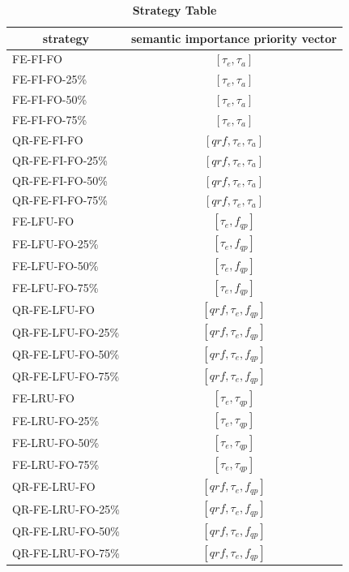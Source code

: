 \begin{table}[!htbp]
\centering
\caption{\textbf{Strategy Table}}
\label{tab:sct}
\begin{tabular}{|l|c|}
\hline
\multicolumn{1}{|c|}{strategy} & semantic importance priority vector \\ \hline
FE-FI-FO & $[\tau_{e}, \tau_{a}]$ \\ \hline
FE-FI-FO-25\% & $[\tau_{e}, \tau_{a}]$ \\ \hline
FE-FI-FO-50\% & $[\tau_{e}, \tau_{a}]$ \\ \hline
FE-FI-FO-75\% & $[\tau_{e}, \tau_{a}]$ \\ \hline
QR-FE-FI-FO & $[qrf, \tau_{e}, \tau_{a}]$ \\ \hline
QR-FE-FI-FO-25\% & $[qrf, \tau_{e}, \tau_{a}]$ \\ \hline
QR-FE-FI-FO-50\% & $[qrf, \tau_{e}, \tau_{a}]$ \\ \hline
QR-FE-FI-FO-75\% & $[qrf, \tau_{e}, \tau_{a}]$ \\ \hline
FE-LFU-FO & $[\tau_{e}, f_{qp}]$ \\ \hline
FE-LFU-FO-25\% & $[\tau_{e}, f_{qp}]$ \\ \hline
FE-LFU-FO-50\% & $[\tau_{e}, f_{qp}]$ \\ \hline
FE-LFU-FO-75\% & $[\tau_{e}, f_{qp}]$ \\ \hline
QR-FE-LFU-FO & $[qrf, \tau_{e}, f_{qp}]$ \\ \hline
QR-FE-LFU-FO-25\% & $[qrf, \tau_{e}, f_{qp}]$ \\ \hline
QR-FE-LFU-FO-50\% & $[qrf, \tau_{e}, f_{qp}]$ \\ \hline
QR-FE-LFU-FO-75\% & $[qrf, \tau_{e}, f_{qp}]$ \\ \hline
FE-LRU-FO & $[\tau_{e}, \tau_{qp}]$ \\ \hline
FE-LRU-FO-25\% & $[\tau_{e}, \tau_{qp}]$ \\ \hline
FE-LRU-FO-50\% & $[\tau_{e}, \tau_{qp}]$ \\ \hline
FE-LRU-FO-75\% & $[\tau_{e}, \tau_{qp}]$ \\ \hline
QR-FE-LRU-FO & $[qrf, \tau_{e}, f_{qp}]$ \\ \hline
QR-FE-LRU-FO-25\% & $[qrf, \tau_{e}, f_{qp}]$ \\ \hline
QR-FE-LRU-FO-50\% & $[qrf, \tau_{e}, f_{qp}]$ \\ \hline
QR-FE-LRU-FO-75\% & $[qrf, \tau_{e}, f_{qp}]$ \\ \hline
\end{tabular}
\end{table}

